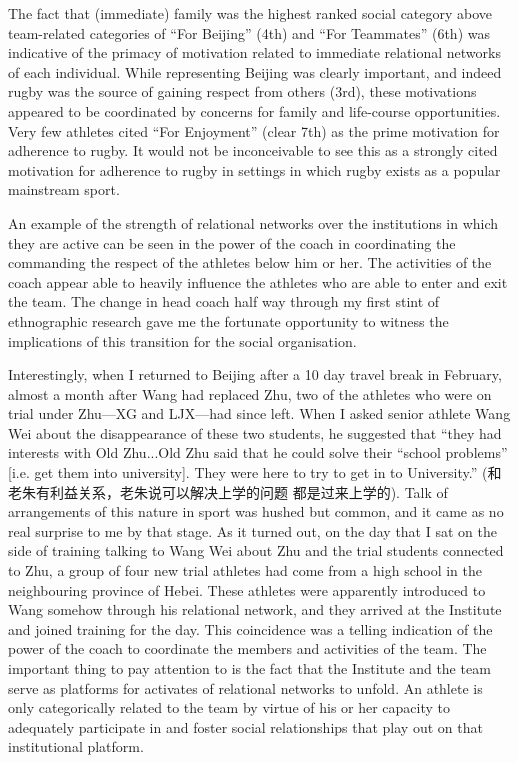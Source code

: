 \begin{CJK}{UTF8}{gbsn}
  The fact that (immediate) family was the highest ranked social category above team-related categories of ``For Beijing'' (4th) and ``For Teammates'' (6th) was indicative of the primacy of motivation related to immediate relational networks of each individual.  While representing Beijing was clearly important, and indeed rugby was the source of gaining respect from others (3rd), these motivations appeared to be coordinated by concerns for family and life-course opportunities.  Very few athletes cited ``For Enjoyment'' (clear 7th) as the prime motivation for adherence to rugby.  It would not be inconceivable to see this as a strongly cited motivation for adherence to rugby in settings in which rugby exists as a popular mainstream sport.

  An example of the strength of relational networks over the institutions in which they are active can be seen in the power of the coach in coordinating the commanding the respect of the athletes below him or her.  The activities of the coach appear able to heavily influence the athletes who are able to enter and exit the team.  The change in head coach half way through my first stint of ethnographic research gave me the fortunate opportunity to witness the implications of this transition for the social organisation.

  Interestingly, when I returned to Beijing after a 10 day travel break in February, almost a month after Wang had replaced Zhu, two of the athletes who were on trial under Zhu---XG and LJX---had since left.  When I asked senior athlete Wang Wei about the disappearance of these two students, he suggested that ``they had interests with Old Zhu...Old Zhu said that he could solve their ``school problems'' [i.e. get them into university]. They were here to try to get in to University.'' (和老朱有利益关系，老朱说可以解决上学的问题 都是过来上学的). Talk of arrangements of this nature in sport was hushed but common, and it came as no real surprise to me by that stage.  As it turned out, on the day that I sat on the side of training talking to Wang Wei about Zhu and the trial students connected to Zhu, a group of four new trial athletes had come from a high school in the neighbouring province of Hebei.  These athletes were apparently introduced to Wang somehow through his relational network, and they arrived at the Institute and joined training for the day. This coincidence was a telling indication of the power of the coach to coordinate the members and activities of the team. The important thing to pay attention to is the fact that the Institute and the team serve as platforms for activates of relational networks to unfold. An athlete is only categorically related to the team by virtue of his or her capacity to adequately participate in and foster social relationships that play out on that institutional platform.


\end{CJK}
